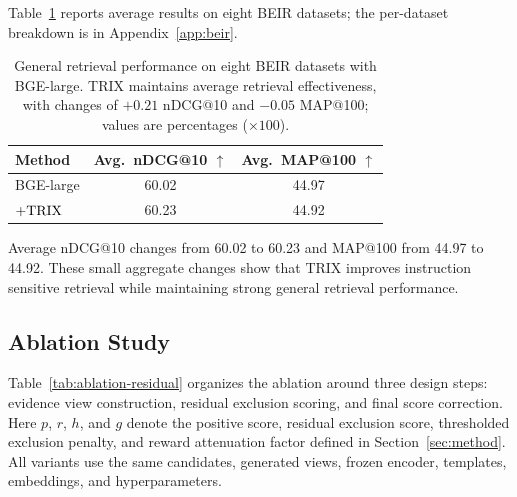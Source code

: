 \documentclass[letterpaper]{article}
\newcommand{\method}{\ifmmode \mathrm{TRIX}\else TRIX\xspace\fi}
\begin{document}
Table~\ref{tab:beir-main} reports average results on eight BEIR datasets; the
per-dataset breakdown is in Appendix~\ref{app:beir}.

\begin{table}[t]
\centering
\small
\setlength{\tabcolsep}{6pt}
\begin{tabular}{lcc}
\toprule
\textbf{Method} & \textbf{Avg.\ nDCG@10 $\uparrow$} & \textbf{Avg.\ MAP@100 $\uparrow$} \\
\midrule
BGE-large & 60.02 & 44.97 \\
\quad $+\method$ & 60.23 & 44.92 \\
\bottomrule
\end{tabular}
\caption{General retrieval performance on eight BEIR datasets with BGE-large.
\method{} maintains average retrieval effectiveness, with changes of $+0.21$
nDCG@10 and $-0.05$ MAP@100; values are percentages ($\times100$).}
\label{tab:beir-main}
\end{table}

Average nDCG@10 changes from 60.02 to 60.23 and MAP@100 from 44.97 to 44.92.
These small aggregate changes show that \method{} improves instruction sensitive retrieval while maintaining strong general retrieval performance.

\subsection{Ablation Study}
\label{sec:ablation-study}

Table~\ref{tab:ablation-residual} organizes the ablation around three design
steps: evidence view construction, residual exclusion scoring, and final score
correction.  Here $p$, $r$, $h$, and $g$ denote the positive score, residual
exclusion score, thresholded exclusion penalty, and reward attenuation factor
defined in Section~\ref{sec:method}.  All variants use the same
candidates, generated views, frozen encoder, templates, embeddings, and
hyperparameters.
\end{document}
